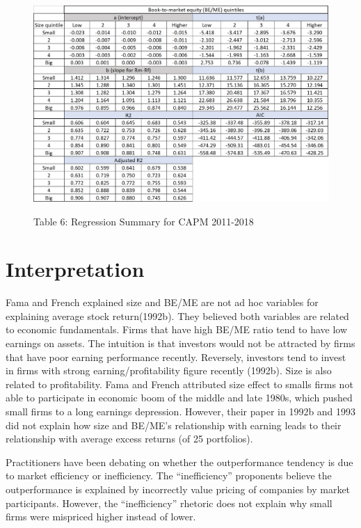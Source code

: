 \documentclass[12pt]{article}
\begin{document}
\begin{figure}[h]
	\centering
	\caption*{Table 6: Regression Summary for CAPM 2011-2018}
	\includegraphics[width=1\linewidth]{A6.png}
	\label{fig:label}
\end{figure}

\section{Interpretation}

Fama and French explained size and BE/ME are not ad hoc variables for explaining average stock return(1992b). They believed both variables are related to economic fundamentals. Firms that have high BE/ME ratio tend to have low earnings on assets. The intuition is that investors would not be attracted by firms that have poor earning performance recently. Reversely, investors tend to invest in firms with strong earning/profitability figure recently (1992b). Size is also related to profitability. Fama and French attributed size effect to smalls firms not able to participate in economic boom of the middle and late 1980s, which pushed small firms to a long earnings depression. However, their paper in 1992b and 1993 did not explain how size and BE/ME’s relationship with earning leads to their relationship with average excess returns (of 25 portfolios).

\noindent Practitioners have been debating on whether the outperformance tendency is due to market efficiency or inefficiency. The “inefficiency” proponents believe the outperformance is explained by incorrectly value pricing of companies by market participants. However, the “inefficiency” rhetoric does not explain why small firms were mispriced higher instead of lower.
\end{document}
